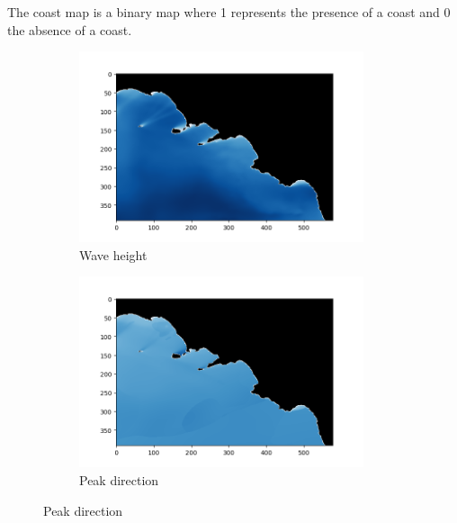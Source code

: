 \documentclass[journal,article,submit,pdftex,moreauthors]{Definitions/mdpi}
\begin{document}
The coast map is a binary map where 1 represents the presence of a coast and 0 the absence of a coast.\\
\begin{figure}[h]
	\begin{subfigure}{0.5\textwidth}
		\centering
		\includegraphics[width=\textwidth]{res/imgs/waveHeight.png}
		\caption{Wave height}
		\label{fig:waveHeight}
	\end{subfigure}
	\begin{subfigure}{0.5\textwidth}
		\centering
		\includegraphics[width=\textwidth]{res/imgs/peakDir.png}
		\caption{Peak direction}
		\label{fig:pDir}
	\end{subfigure}
\end{figure}
\end{document}
